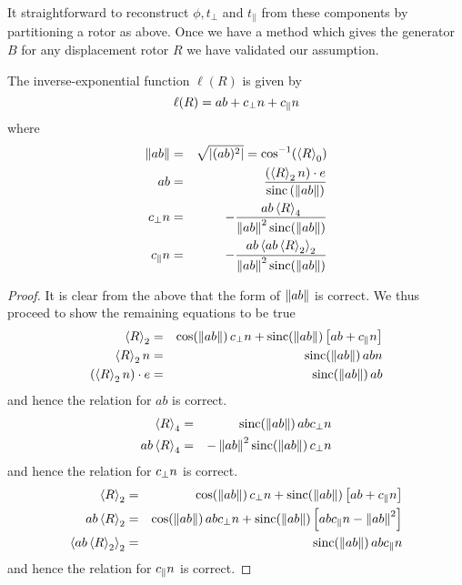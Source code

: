It straightforward to reconstruct $\phi, t_\perp$ and
$t_\parallel$ from these components by partitioning a rotor as above. Once we
have a method which gives the generator $B$ for any displacement rotor $R$ we
have validated our assumption.

\begin{thm}
The inverse-exponential function $\ell(R)$ is given by
\[
\ell(R) = ab + c_\perp n + c_\parallel n
\]
where
\begin{eqnarray*}
\left\Vert ab \right\Vert & = & \sqrt{\left| (ab)^2 \right|}  = \cos^{-1}(\left<R\right>_0) \\
ab & = & \frac{\left(\left<R\right>_2 n \right) \cdot e}
{\mathrm{sinc}\left(\left\Vert ab \right\Vert\right)}\\
c_\perp n & = & - \frac{ab \left<R\right>_4}
{\left\Vert ab \right\Vert^2\mathrm{sinc}(\left\Vert ab \right\Vert)} \\
c_\parallel n & = & - \frac{ab \left<ab \left<R\right>_2\right>_2}
{\left\Vert ab \right\Vert^2\mathrm{sinc}(\left\Vert ab \right\Vert)}
\end{eqnarray*}
\end{thm}
\begin{proof}
It is clear from the above that the form of
$\left\Vert ab \right\Vert$ is correct. We thus proceed to show the remaining
equations to be true
\begin{eqnarray*}
\left<R\right>_2 & = & \cos(\left\Vert ab \right\Vert) \, c_\perp n +
\mathrm{sinc}(\left\Vert ab \right\Vert) \left[ab + c_\parallel n\right]\\
\left<R\right>_2 n & = & \mathrm{sinc}(\left\Vert ab \right\Vert) \, abn\\
\left(\left<R\right>_2 n\right) \cdot e & = & \mathrm{sinc}(\left\Vert ab \right\Vert) \, ab
\end{eqnarray*}
and hence the relation for $ab$ is correct.
\begin{eqnarray*}
\left<R\right>_4 & = & \mathrm{sinc}(\left\Vert ab \right\Vert) \, abc_\perp n \\
ab \left<R\right>_4 & = & -\left\Vert ab \right\Vert^2 \mathrm{sinc}(\left\Vert ab \right\Vert) \, c_\perp n 
\end{eqnarray*}
and hence the relation for $c_\perp n$ is correct.
\begin{eqnarray*}
\left<R\right>_2 & = & \cos(\left\Vert ab \right\Vert) \, c_\perp n +
\mathrm{sinc}(\left\Vert ab \right\Vert) \left[ab + c_\parallel n\right]\\
ab \left<R\right>_2 & = & \cos(\left\Vert ab \right\Vert) \, abc_\perp n +
\mathrm{sinc}(\left\Vert ab \right\Vert) \left[ab c_\parallel n - \left\Vert ab \right\Vert^2\right]\\
\left<ab \left<R\right>_2\right>_2 & = & 
\mathrm{sinc}(\left\Vert ab \right\Vert) \, ab c_\parallel n
\end{eqnarray*}
and hence the relation for $c_\parallel n$ is correct.
\end{proof}

